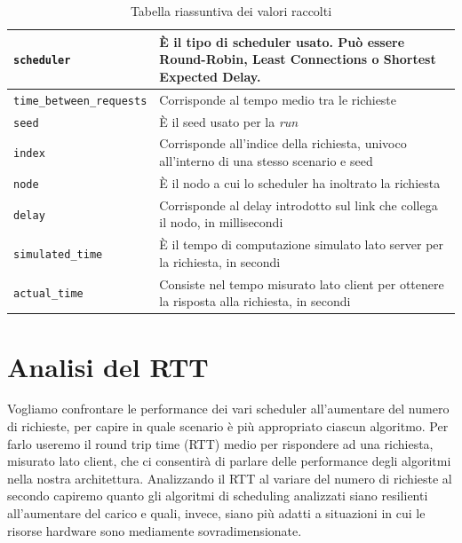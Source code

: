 \documentclass[12pt, hidelinks]{report}
\begin{document}
\begin{table}[H]
\begin{center}
\begin{tabular}{ |m{13em}|m{20em}| } 
 \hline
 \texttt{scheduler} & È il tipo di scheduler usato. Può essere Round-Robin, Least Connections o Shortest Expected Delay. \\
 \hline
 \texttt{time\_between\_requests} & Corrisponde al tempo medio tra le richieste \\
 \hline
 \texttt{seed} & È il seed usato per la \textit{run} \\
 \hline
 \texttt{index} & Corrisponde all'indice della richiesta, univoco all'interno di una stesso scenario e seed \\
 \hline
 \texttt{node} & È il nodo a cui lo scheduler ha inoltrato la richiesta \\
 \hline
 \texttt{delay} & Corrisponde al delay introdotto sul link che collega il nodo, in millisecondi \\
 \hline
 \texttt{simulated\_time} & È il tempo di computazione simulato lato server per la richiesta, in secondi \\
 \hline
 \texttt{actual\_time} & Consiste nel tempo misurato lato client per ottenere la risposta alla richiesta, in secondi \\
 \hline
\end{tabular}
\end{center}
\caption{Tabella riassuntiva dei valori raccolti}
\label{table:1}
\end{table}

\section{Analisi del RTT}

Vogliamo confrontare le performance dei vari scheduler all'aumentare del numero di richieste, per capire in quale scenario è più appropriato ciascun algoritmo. Per farlo useremo il round trip time (RTT) medio per rispondere ad una richiesta, misurato lato client, che ci consentirà di parlare delle performance degli algoritmi nella nostra architettura. 
Analizzando il RTT al variare del numero di richieste al secondo capiremo quanto gli algoritmi di scheduling analizzati siano resilienti all'aumentare del carico e quali, invece, siano più adatti a situazioni in cui le risorse hardware sono mediamente sovradimensionate. 
\end{document}
